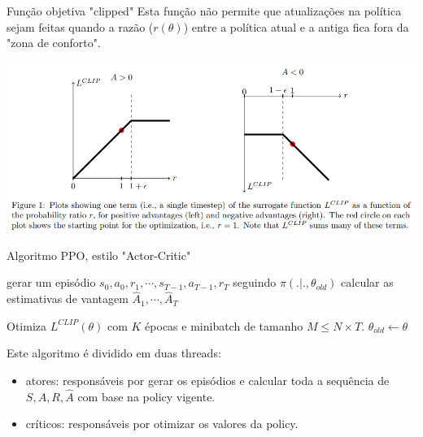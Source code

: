 \documentclass{beamer}
\begin{document}
\begin{frame}{Função objetiva "clipped"}
	Esta função não permite que atualizações na política sejam feitas quando a razão ($r(\theta)$) entre a política atual e a antiga fica fora da "zona de conforto". 
	\begin{center}
		\includegraphics[width=1\textwidth]{img/clip.png}
	\end{center}
\end{frame}

%
%	
%	
%	


\begin{frame}{Algoritmo PPO, estilo "Actor-Critic"}
	
	\begin{algorithmic} 
		\STATE \TA gerar um episódio ${s_{0},a_{0},r_{1},\cdots,s_{T-1},a_{T-1},r_{T}}$ seguindo $\pi(.|.,\theta_{old})$
		\STATE \TA calcular as estimativas de vantagem $\hat{A}_{1}, \cdots, \hat{A}_{T}$
		\ENDFOR
		
		\STATE \TB Otimiza $L^{CLIP}(\theta)$ com $K$ épocas e minibatch de tamanho $M \leq N \times T$. 
		\STATE \TB $\theta_{old} \leftarrow \theta$
		
		\ENDFOR
	\end{algorithmic}	

Este algoritmo é dividido em duas threads: 

\begin{itemize}
	\item atores: responsáveis por gerar os episódios e calcular toda a sequência de $S, A, R, \hat{A}$ com base na policy vigente.
	\item críticos: responsáveis por otimizar os valores da policy. 
\end{itemize}
	
\end{frame}
\end{document}
